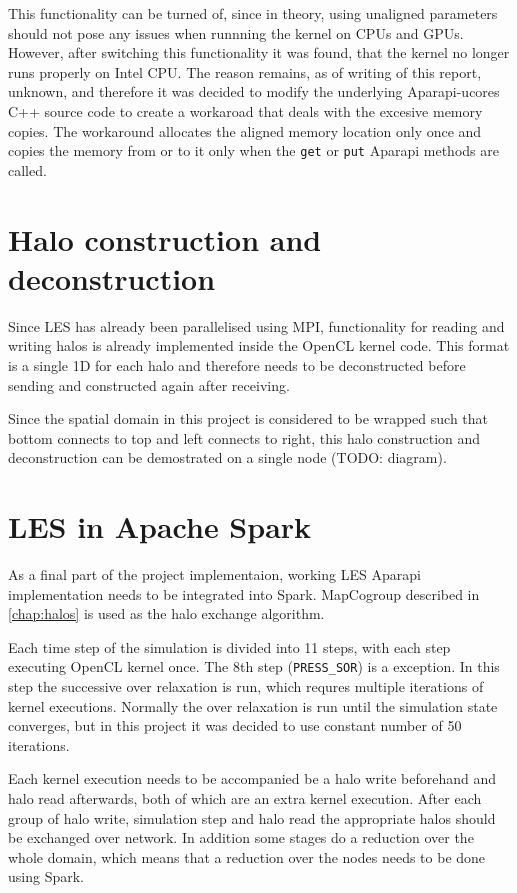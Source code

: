 \documentclass{l4proj}
\begin{document}
This functionality can be turned of, since in theory, using unaligned parameters
should not pose any issues when runnning the kernel on CPUs and GPUs. However,
after switching this functionality it was found, that the kernel no longer runs
properly on Intel CPU. The reason remains, as of writing of this report, unknown,
and therefore it was decided to modify the underlying Aparapi-ucores C++ source code
to create a workaroad that deals with the excesive memory copies. The workaround
allocates the aligned memory location only once and copies the memory from or to it
only when the \texttt{get} or \texttt{put} Aparapi methods are called.

\section{Halo construction and deconstruction}

Since LES has already been parallelised using MPI\cite{les_mpi}, functionality 
for reading and writing halos is already implemented inside the OpenCL kernel code.
This format is a single 1D for each halo and therefore needs to be deconstructed 
before sending and constructed again after receiving. 

Since the spatial domain in this project is considered to be wrapped such that
bottom connects to top and left connects to right, this halo construction and 
deconstruction can be demostrated on a single node (TODO: diagram). 

\section{LES in Apache Spark}

As a final part of the project implementaion, working LES Aparapi implementation
needs to be integrated into Spark. MapCogroup described in \autoref{chap:halos}
is used as the halo exchange algorithm.

Each time step of the simulation is divided into 11 steps, with each step executing
OpenCL kernel once. The 8th step (\texttt{PRESS\_SOR}) is a exception. 
In this step the successive over relaxation is run, which requres multiple 
iterations of kernel executions. Normally the over relaxation is run until 
the simulation state converges, but in this project it was decided to use constant
number of 50 iterations.

Each kernel execution needs to be accompanied be a halo write beforehand 
and halo read afterwards, both of which are an extra kernel execution.
After each group of halo write, simulation step and halo read the appropriate halos
should be exchanged over network. In addition some stages do a reduction over 
the whole domain, which means that a reduction over the nodes needs to be done using Spark.
\end{document}
